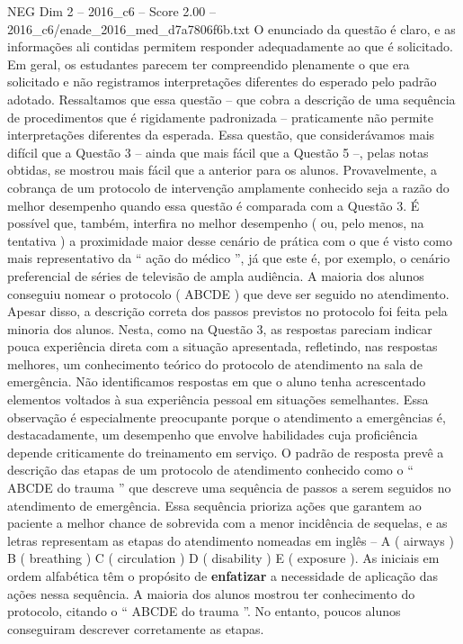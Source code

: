\begin{textsample}{NEG Dim 2 – 2016\_c6 – Score 2.00 – 2016\_c6/enade\_2016\_med\_d7a7806f6b.txt}
O enunciado da questão é claro, e as informações ali contidas permitem responder adequadamente ao que é solicitado.
Em geral, os estudantes parecem ter compreendido plenamente o que era solicitado e não registramos interpretações diferentes do esperado pelo padrão adotado.
Ressaltamos que essa questão – que cobra a descrição de uma sequência de procedimentos que é rigidamente padronizada – praticamente não permite interpretações diferentes da esperada.
Essa questão, que considerávamos mais difícil que a Questão 3 – ainda que mais fácil que a Questão 5 –, pelas notas obtidas, se mostrou mais fácil que a anterior para os alunos.
Provavelmente, a cobrança de um protocolo de intervenção amplamente conhecido seja a razão do melhor desempenho quando essa questão é comparada com a Questão 3.
É possível que, também, interfira no melhor desempenho ( ou, pelo menos, na tentativa ) a proximidade maior desse cenário de prática com o que é visto como mais representativo da “ ação do médico ”, já que este é, por exemplo, o cenário preferencial de séries de televisão de ampla audiência.
A maioria dos alunos conseguiu nomear o protocolo ( ABCDE ) que deve ser seguido no atendimento.
Apesar disso, a descrição correta dos passos previstos no protocolo foi feita pela minoria dos alunos.
Nesta, como na Questão 3, as respostas pareciam indicar pouca experiência direta com a situação apresentada, refletindo, nas respostas melhores, um conhecimento teórico do protocolo de atendimento na sala de emergência.
Não identificamos respostas em que o aluno tenha acrescentado elementos voltados à sua experiência pessoal em situações semelhantes.
Essa observação é especialmente preocupante porque o atendimento a emergências é, destacadamente, um desempenho que envolve habilidades cuja proficiência depende criticamente do treinamento em serviço.
O padrão de resposta prevê a descrição das etapas de um protocolo de atendimento conhecido como o “ ABCDE do trauma ” que descreve uma sequência de passos a serem seguidos no atendimento de emergência.
Essa sequência prioriza ações que garantem ao paciente a melhor chance de sobrevida com a menor incidência de sequelas, e as letras representam as etapas do atendimento nomeadas em inglês – A ( airways ) B ( breathing ) C ( circulation ) D ( disability ) E ( exposure ).
As iniciais em ordem alfabética têm o propósito de \textbf{enfatizar} a necessidade de aplicação das ações nessa sequência.
A maioria dos alunos mostrou ter conhecimento do protocolo, citando o “ ABCDE do trauma ”.
No entanto, poucos alunos conseguiram descrever corretamente as etapas.

\end{textsample}
